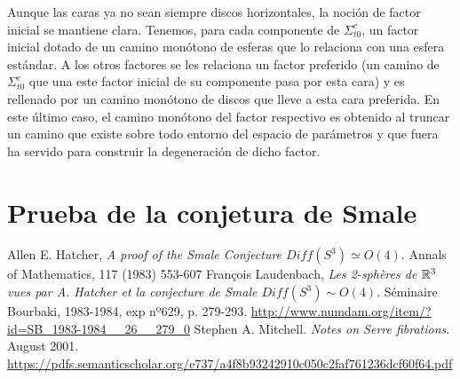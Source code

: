 \documentclass[twoside, 11pt]{article}
\begin{document}
Aunque las caras ya no sean siempre discos horizontales, la noción de factor inicial se mantiene clara. Tenemos, para cada componente de $\Sigma_{t0}^c$, un factor inicial dotado de un camino monótono de esferas que lo relaciona con una esfera estándar. A los otros factores se les relaciona un factor preferido (un camino de $\Sigma_{t0}^c$ que una este factor inicial de su componente pasa por esta cara) y es rellenado por un camino monótono de discos que lleve a esta cara preferida. En este último caso, el camino monótono del factor respectivo es obtenido al truncar un camino que existe sobre todo entorno del espacio de parámetros y que fuera ha servido para construir la degeneración de dicho factor.  

\section{Prueba de la conjetura de Smale}

\begin{thebibliography}{}
 Allen E. Hatcher, \emph{A proof of the Smale Conjecture $Diff(S^3)\simeq O(4)$}. Annals of Mathematics, 117 (1983) 553-607
 François Laudenbach, \emph{Les 2-sphères de $\mathbb{R}^3$ vues par A. Hatcher et la conjecture de Smale $Diff(S^3)\sim O(4)$}. Séminaire Bourbaki, 1983-1984, exp nº629, p. 279-293. \url{http://www.numdam.org/item/?id=SB_1983-1984__26__279_0}
 Stephen A. Mitchell. \emph{Notes on Serre fibrations}. August 2001. \url{https://pdfs.semanticscholar.org/e737/a4f8b93242910c050c2faf761236dcf60f64.pdf}
\end{thebibliography}
\end{document}
